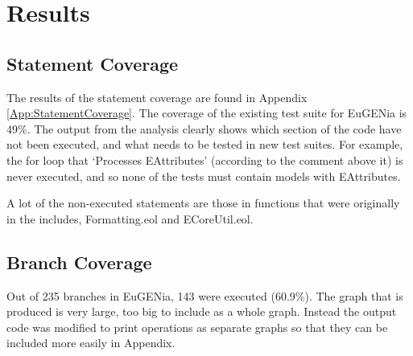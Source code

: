 \section{Results}

\subsection{Statement Coverage}

The results of the statement coverage are found in Appendix \ref{App:StatementCoverage}. The coverage of the existing test suite for EuGENia is 49\%. The output from the analysis clearly shows which section of the code have not been executed, and what needs to be tested in new test suites. For example, the for loop that `Processes EAttributes' (according to the comment above it) is never executed, and so none of the tests must contain models with EAttributes.

A lot of the non-executed statements are those in functions that were originally in the includes, Formatting.eol and ECoreUtil.eol. 

\subsection{Branch Coverage}

Out of 235 branches in EuGENia, 143 were executed (60.9\%). The graph that is produced is very large, too big to include as a whole graph. Instead the output code was modified to print operations as separate graphs so that they can be included more easily in Appendix.